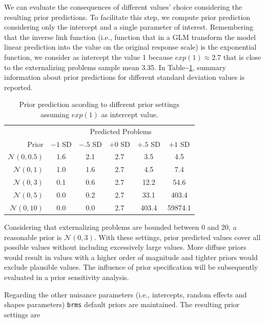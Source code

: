 \documentclass[
]{book}
\begin{document}
We can evaluate the consequences of different values' choice considering the resulting prior predictions. To facilitate this step, we compute prior prediction considering only the intercept and a single parameter of interest. Remembering that the inverse link function (i.e., function that in a GLM transform the model linear prediction into the value on the original response scale) is the exponential function, we consider as intercept the value 1 because \(exp(1) \approx 2.7\) that is close to the externalizing problems sample mean 3.35. In Table\textasciitilde\ref{tab:table-prior-predict}, summary information about prior predictions for different standard deviation values is reported.

\begin{table}[!h]

\caption{\label{tab:table-prior-predict}Prior prediction acording to different prior settings assuming $exp(1)$ as intercept value.}
\centering
\begin{tabular}[t]{rccccc}
\toprule
\multicolumn{1}{c}{ } & \multicolumn{5}{c}{Predicted Problems} \\
\cmidrule(l{3pt}r{3pt}){2-6}
Prior & $-1$ SD & $-.5$ SD & $+0$ SD & $+ .5$ SD & $+ 1$ SD\\
\midrule
$\mathcal{N}(0, 0.5)$ & 1.6 & 2.1 & 2.7 & 3.5 & 4.5\\
$\mathcal{N}(0, 1)$ & 1.0 & 1.6 & 2.7 & 4.5 & 7.4\\
$\mathcal{N}(0, 3)$ & 0.1 & 0.6 & 2.7 & 12.2 & 54.6\\
$\mathcal{N}(0, 5)$ & 0.0 & 0.2 & 2.7 & 33.1 & 403.4\\
$\mathcal{N}(0, 10)$ & 0.0 & 0.0 & 2.7 & 403.4 & 59874.1\\
\bottomrule
\end{tabular}
\end{table}

Considering that externalizing problems are bounded between 0 and 20, a reasonable prior is \(\mathcal{N}(0,3)\). With these settings, prior predicted values cover all possible values without including excessively large values. More diffuse priors would result in values with a higher order of magnitude and tighter priors would exclude plausible values. The influence of prior specification will be subsequently evaluated in a prior sensitivity analysis.

Regarding the other nuisance parameters (i.e., intercepts, random effects and shapes parameters) \texttt{brms} default priors are maintained. The resulting prior settings are
\end{document}
